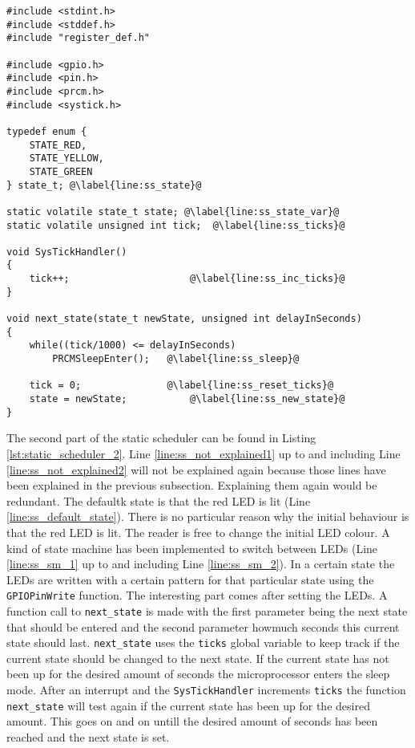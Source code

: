 \begin{lstlisting}[style=CStyle, caption={First part of the static scheduler which defines some data types and states}, captionpos=b, label={lst:static_scheduler_1}, escapechar=@]
#include <stdint.h>
#include <stddef.h>
#include "register_def.h"

#include <gpio.h>
#include <pin.h>
#include <prcm.h>
#include <systick.h>

typedef enum {
    STATE_RED,
    STATE_YELLOW,
    STATE_GREEN
} state_t; @\label{line:ss_state}@

static volatile state_t state; @\label{line:ss_state_var}@
static volatile unsigned int tick;  @\label{line:ss_ticks}@

void SysTickHandler()
{
    tick++;                     @\label{line:ss_inc_ticks}@
}

void next_state(state_t newState, unsigned int delayInSeconds)
{
    while((tick/1000) <= delayInSeconds)
        PRCMSleepEnter();   @\label{line:ss_sleep}@

    tick = 0;               @\label{line:ss_reset_ticks}@
    state = newState;           @\label{line:ss_new_state}@
}

\end{lstlisting}


\newpage
The second part of the static scheduler can be found in Listing \ref{lst:static_scheduler_2}.
Line \ref{line:ss_not_explained1} up to and including Line \ref{line:ss_not_explained2} will not be explained again because those lines have been explained in the previous subsection.
Explaining them again would be redundant.
The defaultk state is that the red LED is lit (Line \ref{line:ss_default_state}).
There is no particular reason why the initial behaviour is that the red LED is lit.
The reader is free to change the initial LED colour.
A kind of state machine has been implemented to switch between LEDs (Line \ref{line:ss_sm_1} up to and including Line \ref{line:ss_sm_2}).
In a certain state the LEDs are written with a certain pattern for that particular state using the \texttt{GPIOPinWrite} function.
The interesting part comes after setting the LEDs.
A function call to \texttt{next\_state} is made with the first parameter being the next state that should be entered and the second parameter howmuch seconds this current state should last.
\texttt{next\_state} uses the \texttt{ticks} global variable to keep track if the current state should be changed to the next state.
If the current state has not been up for the desired amount of seconds the microprocessor enters the sleep mode.
After an interrupt and the \texttt{SysTickHandler} increments \texttt{ticks} the function \texttt{next\_state} will test again if the current state has been up for the desired amount.
This goes on and on untill the desired amount of seconds has been reached and the next state is set.

